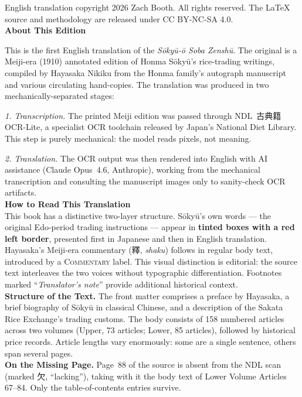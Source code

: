 \documentclass[10pt, openany]{book}
\newcommand{\jp}[1]{{\japanesefont #1}}
\begin{document}
\begin{small}
\noindent English translation copyright \textcopyright{} 2026 Zach Booth.
All rights reserved. The \LaTeX{} source and methodology are released
under CC BY-NC-SA 4.0.\\[1em]

\noindent\textbf{About This Edition}\\[0.3em]
\begin{sloppypar}\noindent This is the first English translation of the
\textit{S\=oky\=u-\=o Soba Zensh\=u}. The original is a Meiji-era
(1910) annotated edition of Honma S\=oky\=u's rice-trading writings,
compiled by Hayasaka Nikiku from the Honma family's autograph manuscript
and various circulating hand-copies. The translation was produced in two
mechanically-separated stages:\end{sloppypar}\par\vspace{0.4em}
\begin{sloppypar}
\noindent\textit{1. Transcription.} The printed Meiji edition was
passed through NDL~\jp{古典籍OCR-Lite}, a specialist OCR toolchain
released by Japan's National Diet Library. This step is purely
mechanical: the model reads pixels, not meaning.
\end{sloppypar}\vspace{0.3em}
\noindent\textit{2. Translation.} The OCR output was then rendered
into English with AI assistance (Claude Opus~4.6, Anthropic), working
from the mechanical transcription and consulting the manuscript images
only to sanity-check OCR artifacts.\\[1em]

\noindent\textbf{How to Read This Translation}\\[0.3em]
\noindent This book has a distinctive two-layer structure. S\=oky\=u's
own words --- the original Edo-period trading instructions --- appear in
\textbf{tinted boxes with a red left border}, presented first in Japanese
and then in English translation. Hayasaka's Meiji-era commentary
(\jp{釋}, \textit{shaku}) follows in regular body text, introduced by
a {\small\scshape Commentary} label. This visual distinction is
editorial: the source text interleaves the two voices without
typographic differentiation. Footnotes marked ``\textit{Translator's
note}'' provide additional historical context.\\[0.5em]

\noindent\textbf{Structure of the Text.}
The front matter comprises a preface by Hayasaka, a brief biography of
S\=oky\=u in classical Chinese, and a description of the Sakata Rice
Exchange's trading customs. The body consists of 158 numbered articles
across two volumes (Upper, 73 articles; Lower, 85 articles), followed by
historical price records. Article lengths vary enormously: some are a
single sentence, others span several pages.\\[0.5em]

\noindent\textbf{On the Missing Page.}
Page~88 of the source is absent from the NDL scan (marked \jp{欠},
``lacking''), taking with it the body text of Lower Volume Articles
67--84. Only the table-of-contents entries survive.
\end{small}
\newpage
\end{document}
